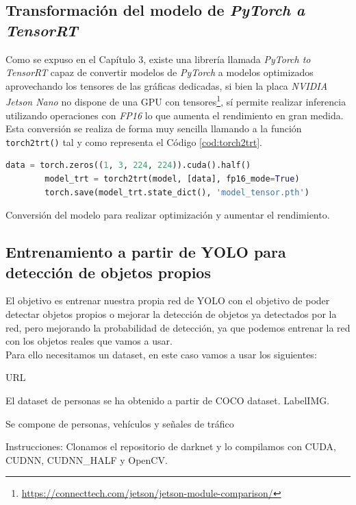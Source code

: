 \subsection{Transformación del modelo de \textit{PyTorch a TensorRT}}
Como se expuso en el Capítulo 3, existe una librería llamada \textit{PyTorch to TensorRT} capaz de convertir modelos de \textit{PyTorch} a modelos optimizados aprovechando los tensores de las gráficas dedicadas, si bien la placa \textit{NVIDIA Jetson Nano} no dispone de una GPU con tensores\footnote{\url{https://connecttech.com/jetson/jetson-module-comparison/}}, sí permite realizar inferencia utilizando operaciones con \textit{FP16} lo que aumenta el rendimiento en gran medida. Esta conversión se realiza de forma muy sencilla llamando a la función \verb|torch2trt()| tal y como representa el Código \ref{cod:torch2trt}.\\

\begin{code}[h]
	\begin{lstlisting}[language=Python]
		data = torch.zeros((1, 3, 224, 224)).cuda().half()
		model_trt = torch2trt(model, [data], fp16_mode=True)
		torch.save(model_trt.state_dict(), 'model_tensor.pth')
	\end{lstlisting}
	\caption[Conversión del modelo para realizar optimización y aumentar el rendimiento.]{Conversión del modelo para realizar optimización y aumentar el rendimiento.}
	\label{cod:torch2trt}
\end{code}

\subsection{Entrenamiento a partir de YOLO para detección de objetos propios}
El objetivo es entrenar nuestra propia red de YOLO con el objetivo de poder detectar objetos propios o mejorar la detección de objetos ya detectados por la red, pero mejorando la probabilidad de detección, ya que podemos entrenar la red con los objetos reales que vamos a usar.\\

Para ello necesitamos un dataset, en este caso vamos a usar los siguientes:

URL

El dataset de personas se ha obtenido a partir de COCO dataset. LabelIMG.

Se compone de personas, vehículos y señales de tráfico

Instrucciones:
Clonamos el repositorio de darknet y lo compilamos con CUDA, CUDNN, CUDNN\_HALF y OpenCV.

